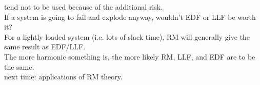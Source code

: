 \documentclass{article}
\begin{document}
tend not to be used because of the additional risk.\\

If a system is going to fail and explode anyway, wouldn't EDF or LLF be worth it?\\

For a lightly loaded system (i.e. lots of slack time), RM will generally give the same result as EDF/LLF.\\

The more harmonic something is, the more likely RM, LLF, and EDF are to be the same.\\

next time: applications of RM theory.
\end{document}
